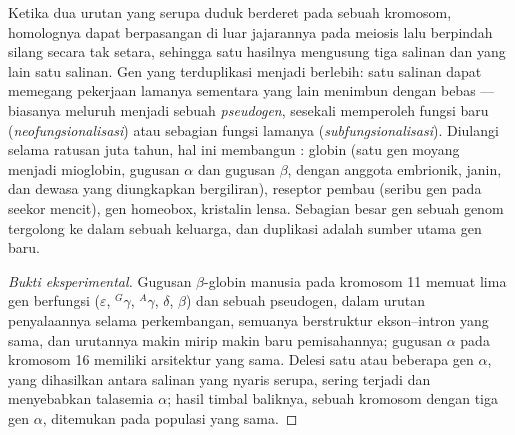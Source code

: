 \begin{proposition}\label{prop:b2:genome-diversification:duplication}
%
Ketika dua urutan yang serupa duduk berderet pada sebuah kromosom,
homolognya dapat berpasangan di luar jajarannya pada meiosis lalu
berpindah silang secara tak setara, sehingga satu hasilnya mengusung
tiga salinan dan yang lain satu salinan. Gen yang terduplikasi menjadi
berlebih: satu salinan dapat memegang pekerjaan lamanya sementara yang
lain menimbun  dengan bebas --- biasanya meluruh
menjadi sebuah \emph{pseudogen}, sesekali memperoleh fungsi baru
(\emph{neofungsionalisasi}) atau sebagian fungsi lamanya
(\emph{subfungsionalisasi}). Diulangi selama ratusan juta
tahun, hal ini membangun \emph{}: globin (satu gen moyang
menjadi mioglobin, gugusan $\alpha$ dan gugusan $\beta$, dengan anggota
embrionik, janin, dan dewasa yang diungkapkan bergiliran), reseptor
pembau (seribu gen pada seekor mencit), gen homeobox, kristalin lensa.
Sebagian besar gen sebuah genom tergolong ke dalam sebuah keluarga, dan
duplikasi adalah sumber utama gen baru.
\end{proposition}
\begin{proof}[Bukti eksperimental]
Gugusan $\beta$-globin manusia pada kromosom 11 memuat lima gen
berfungsi ($\varepsilon$, $^{G}\gamma$, $^{A}\gamma$,
$\delta$, $\beta$) dan sebuah pseudogen, dalam urutan penyalaannya
selama perkembangan, semuanya berstruktur ekson--intron yang sama, dan
urutannya makin mirip makin baru pemisahannya; gugusan $\alpha$ pada
kromosom 16 memiliki arsitektur yang sama. Delesi satu atau beberapa
gen $\alpha$, yang dihasilkan  antara salinan
yang nyaris serupa, sering terjadi dan menyebabkan talasemia $\alpha$;
hasil timbal baliknya, sebuah kromosom dengan tiga gen $\alpha$,
ditemukan pada populasi yang sama.
\end{proof}

